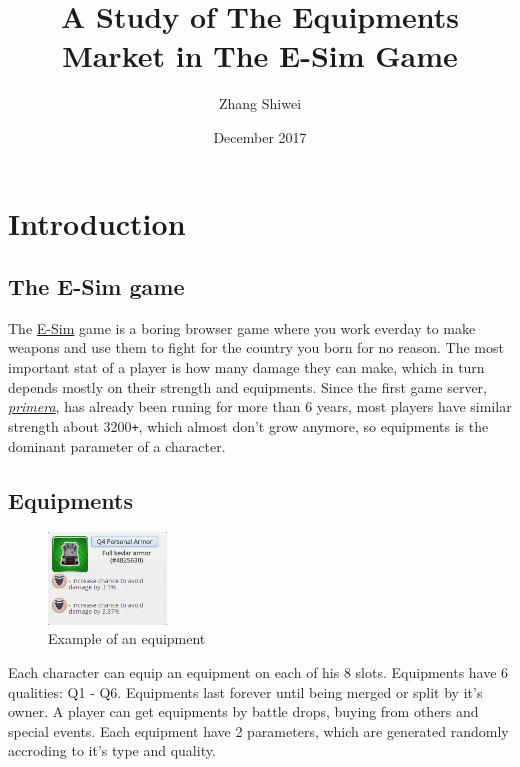 \documentclass{manuscript}
\title{A Study of The Equipments Market in The E-Sim Game}
\author{Zhang Shiwei}
\date{December 2017}
\begin{document}
    \maketitle

    \section{Introduction}

    \subsection{The E-Sim game}

    The \href{https://www.e-sim.org}{E-Sim} game is a boring browser game where you work everday to make weapons and
    use them to fight for the country you born for no reason. The most important stat of a player is how many damage
    they can make, which in turn depends mostly on their strength and equipments. Since the first game server,
    \href{https://primera.e-sim.org}{\textit{primera}}, has already been runing for more than 6 years, most players have similar
    strength about 3200\verb!+!, which almost don't grow anymore, so equipments is the dominant parameter of a character.

    \subsection{Equipments}

    \begin{figure}
        \centering
        \vspace{-1\baselineskip}
        \includegraphics[width=0.28\textwidth]{equipment_example.png}
        \caption{Example of an equipment}\label{fig:equip_exp}
    \end{figure}

    Each character can equip an equipment on each of his 8 slots. Equipments have 6 qualities: Q1 - Q6. Equipments last
    forever until being merged or split by it's owner. A player can get equipments by battle drops, buying from others
    and special events. Each equipment have 2 parameters, which are generated randomly accroding to it's type and quality.
\end{document}
